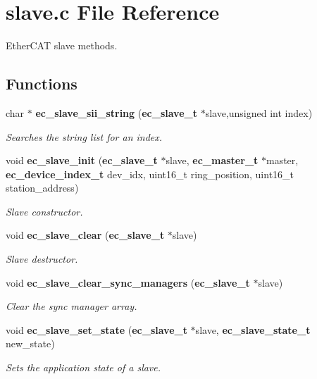 \section{slave.\-c File Reference}
\label{slave_8c}


Ether\-C\-A\-T slave methods.  


\subsection*{Functions}
\begin{DoxyCompactItemize}
\item 
char $\ast$ {\bf ec\-\_\-slave\-\_\-sii\-\_\-string} ({\bf ec\-\_\-slave\-\_\-t} $\ast$slave,unsigned int index)
\begin{DoxyCompactList}\small\item\em Searches the string list for an index. \end{DoxyCompactList}\item 
void {\bf ec\-\_\-slave\-\_\-init} ({\bf ec\-\_\-slave\-\_\-t} $\ast$slave, {\bf ec\-\_\-master\-\_\-t} $\ast$master, {\bf ec\-\_\-device\-\_\-index\-\_\-t} dev\-\_\-idx, uint16\-\_\-t ring\-\_\-position, uint16\-\_\-t station\-\_\-address)
\begin{DoxyCompactList}\small\item\em Slave constructor. \end{DoxyCompactList}\item 
void {\bf ec\-\_\-slave\-\_\-clear} ({\bf ec\-\_\-slave\-\_\-t} $\ast$slave)
\begin{DoxyCompactList}\small\item\em Slave destructor. \end{DoxyCompactList}\item 
void {\bf ec\-\_\-slave\-\_\-clear\-\_\-sync\-\_\-managers} ({\bf ec\-\_\-slave\-\_\-t} $\ast$slave)
\begin{DoxyCompactList}\small\item\em Clear the sync manager array. \end{DoxyCompactList}\item 
void {\bf ec\-\_\-slave\-\_\-set\-\_\-state} ({\bf ec\-\_\-slave\-\_\-t} $\ast$slave, {\bf ec\-\_\-slave\-\_\-state\-\_\-t} new\-\_\-state)
\begin{DoxyCompactList}\small\item\em Sets the application state of a slave. \end{DoxyCompactList}\item 

\end{DoxyCompactItemize}
